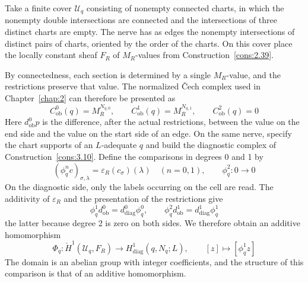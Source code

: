 \begin{construction}\label{cons:3.36}

Take a finite cover $\mathcal{U}_q$ consisting of nonempty connected charts, in which the
nonempty double intersections are connected and the intersections of three distinct
charts are empty.
The nerve has as edges the nonempty intersections of distinct pairs of charts,
oriented by the order of the charts.
On this cover place the locally constant sheaf $F_R$ of $M_R$-values from
Construction~\ref{cons:2.39}.

By connectedness, each section is determined by a single $M_R$-value, and the
restrictions preserve that value.
The normalized \v{C}ech complex used in Chapter~\ref{chap:2} can therefore be
presented as
\begin{equation*}
C_{\mathrm{ob}}^0(q)=M_R^{N_{q,0}},\qquad
C_{\mathrm{ob}}^1(q)=M_R^{N_{q,1}},\qquad
C_{\mathrm{ob}}^2(q)=0
\tag{3.28}\label{eq:3.28}
\end{equation*}
Here $d_{\mathrm{ob}}^0p$ is the difference, after the actual restrictions, between
the value on the end side and the value on the start side of an edge.
On the same nerve, specify the chart supports of an $L$-adequate $q$ and build the
diagnostic complex of Construction~\ref{cons:3.10}.
Define the comparisons in degrees 0 and 1 by
\begin{equation*}
(\phi_q^n c)_{\sigma,\lambda}
=\varepsilon_R(c_\sigma)(\lambda)
\quad(n=0,1),\qquad
\phi_q^2:0\longrightarrow0
\tag{3.29}\label{eq:3.29}
\end{equation*}
On the diagnostic side, only the labels occurring on the cell are read.
The additivity of $\varepsilon_R$ and the presentation of the restrictions give
\begin{equation*}
\phi_q^1d_{\mathrm{ob}}^0=d_{\mathrm{diag}}^0\phi_q^0,\qquad
\phi_q^2d_{\mathrm{ob}}^1=d_{\mathrm{diag}}^1\phi_q^1
\tag{3.30}\label{eq:3.30}
\end{equation*}
the latter because degree 2 is zero on both sides.
We therefore obtain an additive homomorphism
\begin{equation*}
\Phi_q:\check H^1(\mathcal{U}_q,F_R)\longrightarrow
H^1_{\mathrm{diag}}(q,N_q;L),\qquad
[z]\longmapsto[\phi_q^1z]
\tag{3.31}\label{eq:3.31}
\end{equation*}
The domain is an abelian group with integer coefficients, and the structure of this
comparison is that of an additive homomorphism.

\end{construction}

